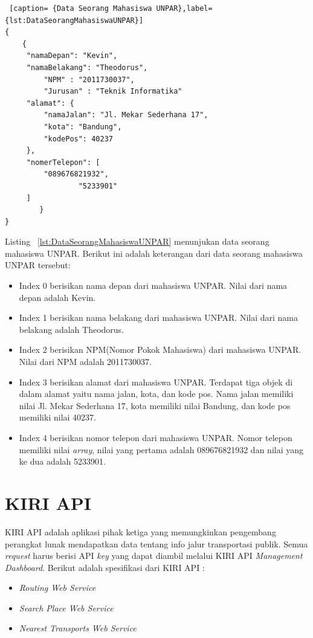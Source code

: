 \begin{lstlisting} [caption= {Data Seorang Mahasiswa UNPAR},label={lst:DataSeorangMahasiswaUNPAR}]
{ 
    {
     "namaDepan": "Kevin",
     "namaBelakang": "Theodorus",
		 "NPM" : "2011730037",
		 "Jurusan" : "Teknik Informatika"
     "alamat": {
         "namaJalan": "Jl. Mekar Sederhana 17",
         "kota": "Bandung",
         "kodePos": 40237
     },
     "nomerTelepon": [ 
         "089676821932",
				 "5233901"
     ]
		}
}
\end{lstlisting} 
Listing ~\ref{lst:DataSeorangMahasiswaUNPAR} menunjukan data seorang mahasiswa UNPAR. Berikut ini adalah keterangan dari data seorang mahasiswa UNPAR tersebut:
\begin{itemize}
	\item Index 0 berisikan nama depan dari mahasiswa UNPAR. Nilai dari nama depan adalah Kevin.
	\item Index 1 berisikan nama belakang dari mahasiswa UNPAR. Nilai dari nama belakang adalah Theodorus.
	\item Index 2 berisikan NPM(Nomor Pokok Mahasiswa) dari mahasiswa UNPAR. Nilai dari NPM adalah 2011730037.
	\item Index 3 berisikan alamat dari mahasiswa UNPAR. Terdapat tiga objek di dalam alamat yaitu nama jalan, kota, dan kode pos. Nama jalan memiliki nilai Jl. Mekar Sederhana 17, kota memiliki nilai Bandung, dan kode pos memiliki nilai 40237.
	\item Index 4 berisikan nomor telepon dari mahasiswa UNPAR. Nomor telepon memiliki nilai \textit{array}, nilai yang pertama adalah 089676821932 dan nilai yang ke dua adalah 5233901.
\end{itemize}

\section{KIRI API\cite{Kiri}}
KIRI API adalah aplikasi pihak ketiga yang memungkinkan pengembang perangkat lunak mendapatkan data tentang info jalur transportasi publik. Semua \textit{request} harus berisi API \textit{key} yang dapat diambil melalui KIRI API \textit{Management Dashboard}. Berikut adalah spesifikasi dari KIRI API :

\begin{itemize}
	\item \textit{Routing Web Service}
	\item \textit{Search Place Web Service}
	\item \textit{Nearest Transports Web Service}
\end{itemize}

